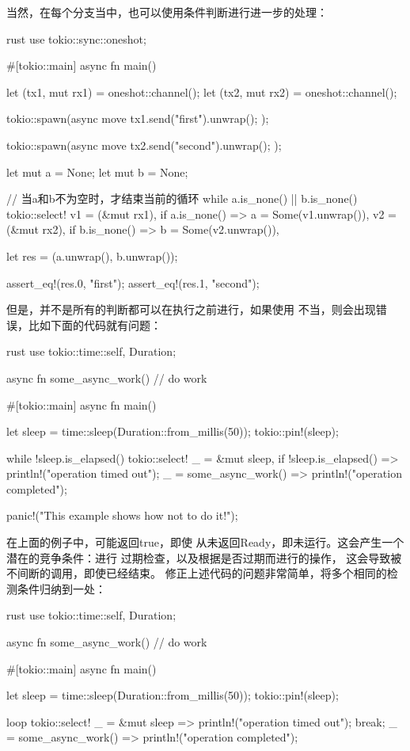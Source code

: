 当然，在每个分支当中，也可以使用条件判断进行进一步的处理：
\begin{code-block}{rust}
use tokio::sync::oneshot;

#[tokio::main]
async fn main() {
    let (tx1, mut rx1) = oneshot::channel();
    let (tx2, mut rx2) = oneshot::channel();

    tokio::spawn(async move {
        tx1.send("first").unwrap();
    });

    tokio::spawn(async move {
        tx2.send("second").unwrap();
    });

    let mut a = None;
    let mut b = None;

    // 当a和b不为空时，才结束当前的循环
    while a.is_none() || b.is_none() {
        tokio::select! {
            v1 = (&mut rx1), if a.is_none() => a = Some(v1.unwrap()),
            v2 = (&mut rx2), if b.is_none() => b = Some(v2.unwrap()),
        }
    }

    let res = (a.unwrap(), b.unwrap());

    assert_eq!(res.0, "first");
    assert_eq!(res.1, "second");
}
\end{code-block}

但是，并不是所有的判断都可以在执行之前进行，如果使用
不当，则会出现错误，比如下面的代码就有问题：
\begin{code-block}{rust}
use tokio::time::{self, Duration};

async fn some_async_work() {
    // do work
}

#[tokio::main]
async fn main() {
    let sleep = time::sleep(Duration::from_millis(50));
    tokio::pin!(sleep);

    while !sleep.is_elapsed() {
        tokio::select! {
            _ = &mut sleep, if !sleep.is_elapsed() => {
                println!("operation timed out");
            }
            _ = some_async_work() => {
                println!("operation completed");
            }
        }
    }

    panic!("This example shows how not to do it!");
}
\end{code-block}
在上面的例子中，可能返回true，即使
从未返回Ready，即未运行。这会产生一个潜在的竞争条件：进行
过期检查，以及根据是否过期而进行的操作，
这会导致被不间断的调用，即使已经结束。
修正上述代码的问题非常简单，将多个相同的检测条件归纳到一处：
\begin{code-block}{rust}
use tokio::time::{self, Duration};

async fn some_async_work() {
    // do work
}

#[tokio::main]
async fn main() {
    let sleep = time::sleep(Duration::from_millis(50));
    tokio::pin!(sleep);

    loop {
        tokio::select! {
            _ = &mut sleep => {
                println!("operation timed out");
                break;
            }
            _ = some_async_work() => {
                println!("operation completed");
            }
        }
    }
}
\end{code-block}

